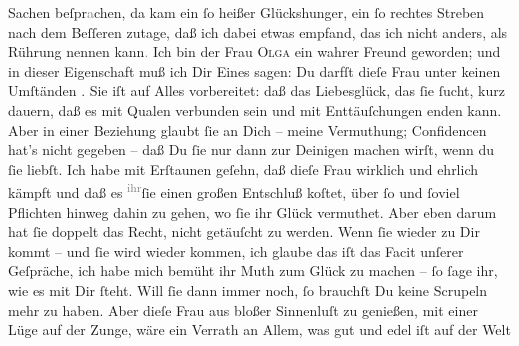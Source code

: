 					Sachen beſpr\textcolor{gray}{a}chen, da kam ein{ }ſo heißer Glückshunger, ein{ }ſo
					rechtes Streben nach dem Beſſeren zutage, daß ich dabei etwas empfand, das ich
					nicht anders, als Rührung nennen kann\textcolor{gray}{.} Ich bin der Frau \textsc{Olga} ein wahrer Freund geworden; und in dieser Eigenschaft muß ich Dir Eines
					sagen: Du darfſt dieſe Frau unter keinen Umſtänden \label{K_L02648-3v}\label{K_L02648-3}. Sie iſt auf Alles vorbereitet: daß das Liebesglück, das{ }ſie{ }ſucht, kurz dauern, daß es mit Qualen verbunden sein und mit Enttäuſchungen
					enden kann. Aber in einer Beziehung glaubt{ }ſie an Dich – meine Vermuthung; {\pb}Confidencen hat’s nicht gegeben – daß Du{ }ſie
					nur dann zur Deinigen machen wirſt, wenn du{ }ſie liebſt. Ich habe mit Erſtaunen
					geſehn, daß dieſe Frau
					wirklich und ehrlich kämpft und daß es \substVorne{}\textsuperscript{\textcolor{gray}{ihr}}\substDazwischen{}ſie\substHinten{} einen großen Entschluß koſtet, über{ }ſo und{ }ſoviel Pflichten hinweg
					dahin zu gehen, wo{ }ſie ihr Glück vermuthet. Aber eben darum hat{ }ſie doppelt das
					Recht, nicht getäuſcht zu werden. Wenn{ }ſie wieder zu Dir kommt – und{ }ſie wird
					wieder kommen, ich glaube das iſt das Facit unſerer Geſpräche, ich habe mich
					bemüht ihr Muth zum Glück zu machen –{ }ſo{ }ſage ihr, wie es mit Dir{ }ſteht. Will{ }ſie dann immer noch,{ }ſo brauchſt Du keine Scrupeln {\pb}mehr zu haben. Aber dieſe Frau aus bloßer Sinnenluſt zu
					genießen, mit einer Lüge auf der Zunge, wäre ein Verrath an Allem, was gut und
					edel iſt auf der Welt{\dotsfour}\pend
           
